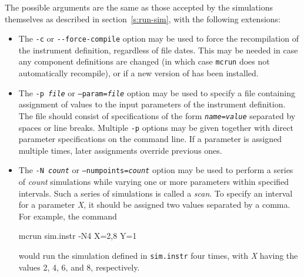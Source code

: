 The possible arguments are the same as those accepted by the simulations
themselves as described in section~\ref{s:run-sim}, with the following
extensions:
\begin{itemize}
\item The \verb+-c+ or \verb+--force-compile+ option may be used to force the
  recompilation of the instrument definition, regardless of file dates. This may
  be needed in case any component definitions are changed (in which case
  \verb+mcrun+ does not automatically recompile), or if a new version of \MCS
  has been installed.
\item The \texttt{-p \textit{file}} or \texttt{--param=\textit{file}} option may be
  used to specify a file containing assignment of values to the input parameters
  of the instrument definition. The file should consist of specifications of the
  form \texttt{\textit{name\/}=\textit{value\/}} separated by spaces or line
  breaks. Multiple \verb+-p+ options may be given together with direct parameter
  specifications on the command line. If a parameter is assigned multiple times,
  later assignments override previous ones.
\item The \texttt{-N \textit{count}} or \texttt{--numpoints=\textit{count}} option
  may be used to perform a series of \textit{count\/} simulations while
  varying one or more parameters within specified intervals. Such a
  series of simulations is called a \emph{scan}. To specify
  an interval for a parameter \textit{X}, it should be assigned two
  values separated by a comma. For example, the command
\begin{bash}
mcrun sim.instr -N4 X=2,8 Y=1
\end{bash}
would run the simulation defined in \verb+sim.instr+ four times, with
\textit{X} having the values 2, 4, 6, and 8, respectively.


\end{itemize}
